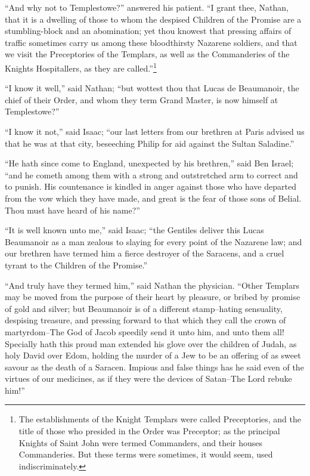 ``And why not to Templestowe?'' answered his patient. ``I grant thee,
Nathan, that it is a dwelling of those to whom the despised Children of
the Promise are a stumbling-block and an abomination; yet thou knowest
that pressing affairs of traffic sometimes carry us among these
bloodthirsty Nazarene soldiers, and that we visit the Preceptories of
the Templars, as well as the Commanderies of the Knights Hospitallers,
as they are called.''\footnote{The establishments of the Knight Templars
were called
Preceptories, and the title of those who presided in the Order was
Preceptor; as the principal Knights of Saint John were termed
Commanders, and their houses Commanderies. But these terms were
sometimes, it would seem, used indiscriminately.}

``I know it well,'' said Nathan; ``but wottest thou that Lucas de
Beaumanoir, the chief of their Order, and whom they term Grand Master,
is now himself at Templestowe?''

``I know it not,'' said Isaac; ``our last letters from our brethren at
Paris advised us that he was at that city, beseeching Philip for aid
against the Sultan Saladine.''

``He hath since come to England, unexpected by his brethren,'' said Ben
Israel; ``and he cometh among them with a strong and outstretched arm to
correct and to punish. His countenance is kindled in anger against those
who have departed from the vow which they have made, and great is the
fear of those sons of Belial. Thou must have heard of his name?''

``It is well known unto me,'' said Isaac; ``the Gentiles deliver this
Lucas Beaumanoir as a man zealous to slaying for every point of the
Nazarene law; and our brethren have termed him a fierce destroyer of the
Saracens, and a cruel tyrant to the Children of the Promise.''

``And truly have they termed him,'' said Nathan the physician. ``Other
Templars may be moved from the purpose of their heart by pleasure, or
bribed by promise of gold and silver; but Beaumanoir is of a different
stamp--hating sensuality, despising treasure, and pressing forward to
that which they call the crown of martyrdom--The God of Jacob speedily
send it unto him, and unto them all! Specially hath this proud man
extended his glove over the children of Judah, as holy David over Edom,
holding the murder of a Jew to be an offering of as sweet savour as the
death of a Saracen. Impious and false things has he said even of the
virtues of our medicines, as if they were the devices of Satan--The Lord
rebuke him!''

